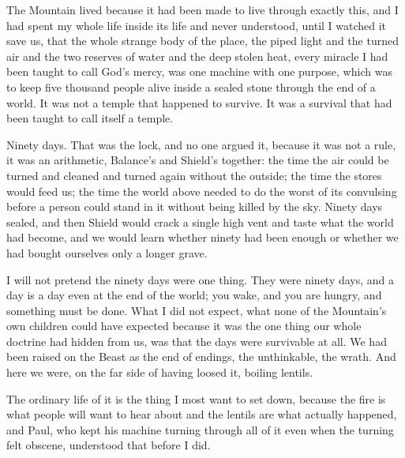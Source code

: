 The Mountain lived because it had been made to live through exactly this, and I had spent my whole life inside its life and never understood, until I watched it save us, that the whole strange body of the place, the piped light and the turned air and the two reserves of water and the deep stolen heat, every miracle I had been taught to call God's mercy, was one machine with one purpose, which was to keep five thousand people alive inside a sealed stone through the end of a world. It was not a temple that happened to survive. It was a survival that had been taught to call itself a temple.\par

\ornament

Ninety days. That was the lock, and no one argued it, because it was not a rule, it was an arithmetic, Balance's and Shield's together: the time the air could be turned and cleaned and turned again without the outside; the time the stores would feed us; the time the world above needed to do the worst of its convulsing before a person could stand in it without being killed by the sky. Ninety days sealed, and then Shield would crack a single high vent and taste what the world had become, and we would learn whether ninety had been enough or whether we had bought ourselves only a longer grave.\par

I will not pretend the ninety days were one thing. They were ninety days, and a day is a day even at the end of the world; you wake, and you are hungry, and something must be done. What I did not expect, what none of the Mountain's own children could have expected because it was the one thing our whole doctrine had hidden from us, was that the days were survivable at all. We had been raised on the Beast as the end of endings, the unthinkable, the wrath. And here we were, on the far side of having loosed it, boiling lentils.\par

\ornament

The ordinary life of it is the thing I most want to set down, because the fire is what people will want to hear about and the lentils are what actually happened, and Paul, who kept his machine turning through all of it even when the turning felt obscene, understood that before I did.\par

